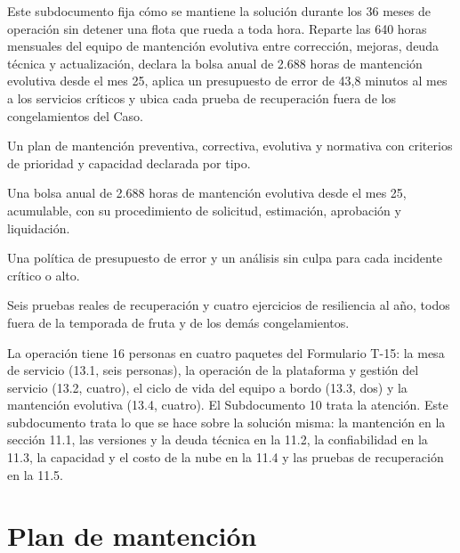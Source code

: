 
\begin{resumenApertura}
Este subdocumento fija cómo se mantiene la solución durante los 36 meses de operación sin detener una
flota que rueda a toda hora. Reparte las 640 horas mensuales del equipo de mantención evolutiva entre
corrección, mejoras, deuda técnica y actualización, declara la bolsa anual de 2.688 horas de mantención
evolutiva desde el mes 25, aplica un presupuesto de error de 43,8 minutos al mes a los servicios críticos y ubica cada
prueba de recuperación fuera de los congelamientos del Caso.
\begin{recibe}
  \item Un plan de mantención preventiva, correctiva, evolutiva y normativa con criterios de prioridad y capacidad declarada por tipo.
  \item Una bolsa anual de 2.688 horas de mantención evolutiva desde el mes 25, acumulable, con su procedimiento de solicitud, estimación, aprobación y liquidación.
  \item Una política de presupuesto de error y un análisis sin culpa para cada incidente crítico o alto.
  \item Seis pruebas reales de recuperación y cuatro ejercicios de resiliencia al año, todos fuera de la temporada de fruta y de los demás congelamientos.
\end{recibe}
\end{resumenApertura}

La operación tiene 16 personas en cuatro paquetes del Formulario T-15: la mesa de servicio (13.1, seis
personas), la operación de la plataforma y gestión del servicio (13.2, cuatro), el ciclo de vida del
equipo a bordo (13.3, dos) y la mantención evolutiva (13.4, cuatro). El Subdocumento 10 trata la
atención. Este subdocumento trata lo que se hace sobre la solución misma: la mantención en la sección
11.1, las versiones y la deuda técnica en la 11.2, la confiabilidad en la 11.3, la capacidad y el costo
de la nube en la 11.4 y las pruebas de recuperación en la 11.5.

\section{Plan de mantención}\label{sec:11-plan-de-mantencion}

